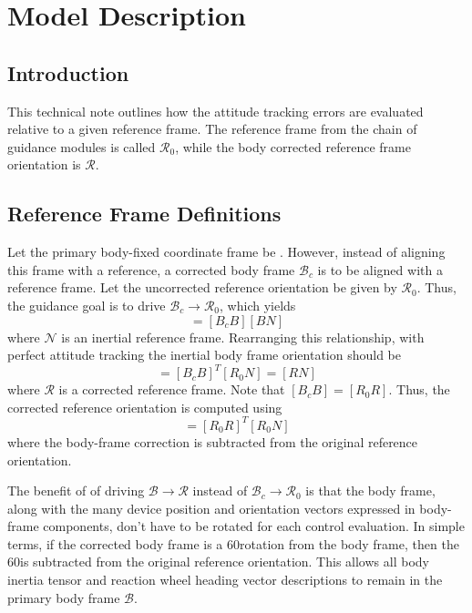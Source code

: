 
\section{Model Description}
\subsection{Introduction}
This technical note outlines how the attitude tracking errors are evaluated relative to a given reference frame. The reference frame from the chain of guidance modules is called $\mathcal{R}_{0}$, while the body corrected reference frame orientation is $\mathcal{R}$.  

\subsection{Reference Frame Definitions}
Let the primary body-fixed coordinate frame be . However, instead of aligning this frame with a reference, a corrected body frame $\mathcal{B}_{c}$ is to be aligned with a reference frame.   Let the uncorrected reference orientation be given by $\mathcal{R}_{0}$.  Thus, the guidance goal is to drive $\mathcal{B}_{c} \rightarrow \mathcal{R}_{0}$, which yields
\begin{equation}
	[R_{0} N] = [B_{c} B] [BN]
\end{equation}
where $\mathcal{N}$ is an inertial reference frame.  Rearranging this relationship, with perfect attitude tracking the inertial body frame orientation should be
\begin{equation}
	 [BN] = [B_{c} B]^{T} [R_{0}N]  = [RN]
\end{equation}
where $\mathcal{R}$ is a corrected reference frame.  Note that $[B_{c} B] = [R_{0}R]$.  Thus, the corrected reference orientation is computed using
\begin{equation}
	 [RN] = [R_{0} R]^{T} [R_{0}N] 
\end{equation}
where the body-frame correction is subtracted from the original reference orientation.  

The benefit of of driving $\mathcal{B} \rightarrow \mathcal{R}$ instead of $\mathcal{B}_{c} \rightarrow \mathcal{R}_{0}$ is that the body frame, along with the many device position and orientation vectors expressed in  body-frame components, don't have to be rotated for each control evaluation.  In simple terms, if the corrected body frame is a 60\dg rotation from the body frame, then the 60\dg is subtracted from the original reference orientation.  This allows all body inertia tensor and reaction wheel heading vector descriptions to remain in the primary body frame $\mathcal{B}$.  

